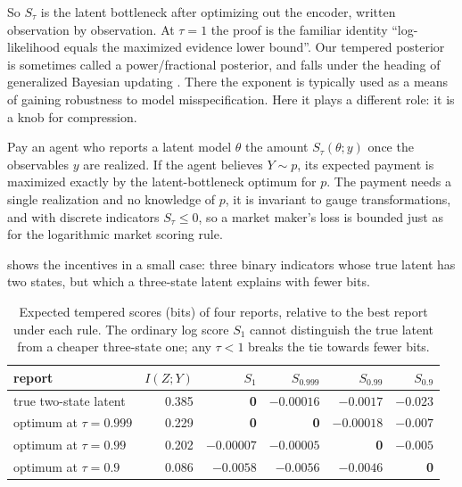 \begin{draftblock}
So $S_\tau$ is the latent bottleneck after optimizing out the encoder, written observation by observation. At $\tau=1$ the proof is the familiar identity ``log-likelihood equals the maximized evidence lower bound''. Our tempered posterior is sometimes called a power/fractional posterior, and falls under the heading of generalized Bayesian updating \citep{grunwaldSafeBayesianLearning2012,bissiriGeneralFrameworkUpdating2016}. There the exponent is typically used as a means of gaining robustness to model misspecification. Here it plays a different role: it is a knob for compression.

\begin{corollary}[elicitation]\label{arb:cor:elicit}
Pay an agent who reports a latent model $\theta$ the amount $S_\tau(\theta;y)$ once the observables $y$ are realized. If the agent believes $Y\sim p$, its expected payment is maximized exactly by the latent-bottleneck optimum for $p$. The payment needs a single realization and no knowledge of $p$, it is invariant to gauge transformations, and with discrete indicators $S_\tau\le0$, so a market maker's loss is bounded just as for the logarithmic market scoring rule.
\end{corollary}

 shows the incentives in a small case: three binary indicators whose true latent has two states, but which a three-state latent explains with fewer bits.

\begin{table}[ht]
\centering\small
\begin{tabular}{@{}lrrrrr@{}}
\toprule
report & $I(Z;Y)$ & $S_1$ & $S_{0.999}$ & $S_{0.99}$ & $S_{0.9}$ \\
\midrule
true two-state latent & 0.385 & \textbf{0} & $-0.00016$ & $-0.0017$ & $-0.023$ \\
optimum at $\tau=0.999$ & 0.229 & \textbf{0} & \textbf{0} & $-0.00018$ & $-0.007$ \\
optimum at $\tau=0.99$ & 0.202 & $-0.00007$ & $-0.00005$ & \textbf{0} & $-0.005$ \\
optimum at $\tau=0.9$ & 0.086 & $-0.0058$ & $-0.0056$ & $-0.0046$ & \textbf{0} \\
\bottomrule
\end{tabular}
\caption{Expected tempered scores (bits) of four reports, relative to the best report under each rule. The ordinary log score $S_1$ cannot distinguish the true latent from a cheaper three-state one; any $\tau<1$ breaks the tie towards fewer bits.}\label{arb:tab:incentives}
\end{table}


\end{draftblock}
